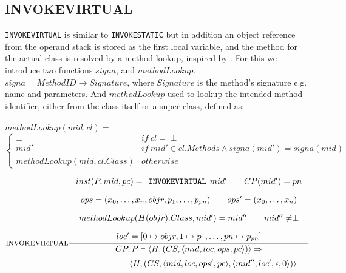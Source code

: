 \subsection{INVOKEVIRTUAL}
\texttt{INVOKEVIRTUAL} is similar to \texttt{INVOKESTATIC} but in addition an object reference from the operand stack is stored as the first local variable, and the method for the actual class is resolved by a method lookup, inspired by \cite{dalvik}. For this we introduce two functions $signa$, and $methodLookup$. $signa = MethodID \to Signature$, where $Signature$ is the method's signature e.g. name and parameters. And $methodLookup$ used to lookup the intended method identifier, either from the class itself or a super class, defined as: \\\\
$methodLookup(mid, cl) = $ \vspace{-10px}
\[
\begin{cases}
  \perp & if\ cl = \perp \\
  mid'  & if\ mid' \in cl.Methods \wedge signa(mid') = signa (mid)  \\
  methodLookup(mid, cl.Class) & otherwise
\end{cases}
\]


$$\inference[INVOKEVIRTUAL]{
inst(P,mid,pc) = \texttt{INVOKEVIRTUAL }mid' \semsp 
CP(mid') = pn \semnl \\
ops = (x_0, \ldots, x_n, objr, p_1, \ldots, p_{pn}) \semsp
ops' = (x_0, \ldots, x_{n}) \semnl\\ 
methodLookup(H(objr).Class, mid') = mid'' \semsp
mid'' \neq \perp \semnl\\
loc' = [0 \mapsto objr, 1 \mapsto p_{1}, \ldots, pn \mapsto p_{pn}]
}
{CP, P \vdash \langle H, (CS, \langle mid, loc, ops, pc \rangle)\rangle \Rightarrow }$$
$$\hspace{130px}\langle H, (CS, \langle mid, loc, ops', pc \rangle, \langle mid'', loc', \epsilon, 0 \rangle)\rangle$$

